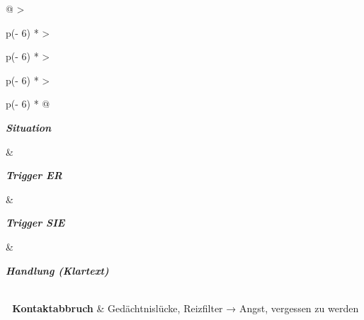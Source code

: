 \begin{longtable}[]{@{}
  >{\raggedright\arraybackslash}p{(\columnwidth - 6\tabcolsep) * }
  >{\raggedright\arraybackslash}p{(\columnwidth - 6\tabcolsep) * }
  >{\raggedright\arraybackslash}p{(\columnwidth - 6\tabcolsep) * }
  >{\raggedright\arraybackslash}p{(\columnwidth - 6\tabcolsep) * }@{}}
\toprule\noalign{}
\begin{minipage}[b]{\linewidth}\raggedright
\emph{\textbf{Situation}}
\end{minipage} \& \begin{minipage}[b]{\linewidth}\raggedright
\emph{\textbf{Trigger ER}}
\end{minipage} \& \begin{minipage}[b]{\linewidth}\raggedright
\emph{\textbf{Trigger SIE}}
\end{minipage} \& \begin{minipage}[b]{\linewidth}\raggedright
\emph{\textbf{Handlung (Klartext)}}
\end{minipage} \\
\midrule\noalign{}
\endhead
\bottomrule\noalign{}
\endlastfoot
\textbf{📵 Kontaktabbruch} \& Gedächtnislücke, Reizfilter → Angst, vergessen zu werden


\end{longtable}
